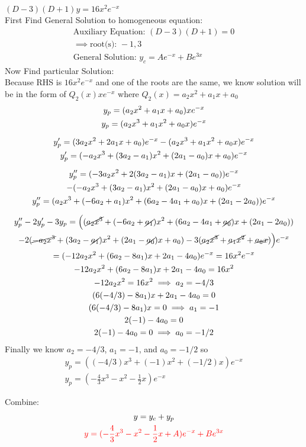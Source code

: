 \item [25.] $(D-3)(D+1)y=16x^2e^{-x}$\\[2mm]
First Find General Solution to homogeneous equation:
\begin{gather*}
    \text{Auxiliary Equation: } (D-3)(D+1)=0\\
    \implies \text{root(s): } -1, 3\\
    \text{General Solution: } y_c=Ae^{-x}+Be^{3x}
\end{gather*}
Now Find particular Solution:\\
Because RHS is $16x^2e^{-x}$ and one of the roots are the same, we know solution will be in the form of $Q_2(x)xe^{-x}$ where $Q_2(x) = a_2x^2+a_1x+a_0$
\begin{gather*}
    y_p = (a_2x^2+a_1x+a_0)xe^{-x}\\
    y_p = (a_2x^3+a_1x^2+a_0x)e^{-x}\\[2mm]
    y_p' = (3a_2x^2+2a_1x+a_0)e^{-x}-(a_2x^3+a_1x^2+a_0x)e^{-x}\\
    y_p' = (-a_2x^3+(3a_2-a_1)x^2+(2a_1-a_0)x+a_0)e^{-x}\\[2mm]
    y_p'' = (-3a_2x^2+2(3a_2-a_1)x+(2a_1-a_0))e^{-x}\\
    -(-a_2x^3+(3a_2-a_1)x^2+(2a_1-a_0)x+a_0)e^{-x}\\
    y_p'' = (a_2x^3+(-6a_2+a_1)x^2+(6a_2-4a_1+a_0)x+(2a_1-2a_0))e^{-x}\\[2mm]
    y_p''-2y_p'-3y_p=\Big(
    (\cancel{a_2x^3}+(-6a_2+\cancel{a_1})x^2+(6a_2-4a_1+\cancel{a_0})x+(2a_1-2a_0))\\
    -2(\cancel{-a_2x^3}+(3a_2-\cancel{a_1})x^2+(2a_1-\cancel{a_0})x+a_0)
    -3(\cancel{a_2x^3}+\cancel{a_1x^2}+\cancel{a_0x})\Big)e^{-x}\\
    =(-12a_2x^2+(6a_2-8a_1)x+2a_1-4a_0)e^{-x}=16x^2e^{-x}\\
    -12a_2x^2+(6a_2-8a_1)x+2a_1-4a_0=16x^2\\
    -12a_2x^2=16x^2 \implies a_2=-4/3\\
    (6(-4/3)-8a_1)x+2a_1-4a_0=0\\
    (6(-4/3)-8a_1)x=0 \implies a_1 = -1\\
    2(-1)-4a_0=0\\
    2(-1)-4a_0=0 \implies a_0 = -1/2
\end{gather*}
Finally we know $a_2 = -4/3$, $a_1 = -1$, and $a_0 = -1/2$ so 
\begin{gather*}
    y_p = ((-4/3)x^3+(-1)x^2+(-1/2)x)e^{-x}\\
    y_p = (-\frac{4}{3}x^3-x^2-\frac{1}{2}x)e^{-x}
\end{gather*}



Combine:
\begin{gather*}
    y=y_c+y_p\\
    \textcolor{red}{y = (-\frac{4}{3}x^3-x^2-\frac{1}{2}x+A)e^{-x}+Be^{3x}}
\end{gather*}